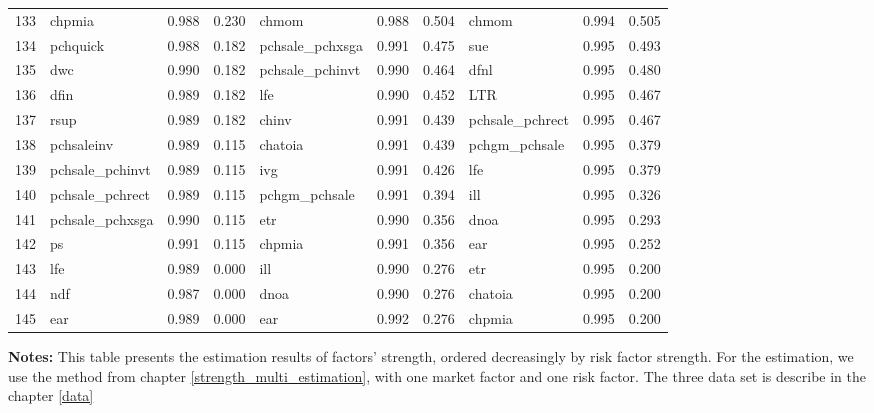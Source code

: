 \begin{landscape}
\begin{footnotesize}
\begin{longtable}{l|lcc|lcc|lcc}
  133 & chpmia & 0.988 & 0.230 & chmom & 0.988 & 0.504 & chmom & 0.994 & 0.505 \\ 
  134 & pchquick & 0.988 & 0.182 & pchsale\_pchxsga & 0.991 & 0.475 & sue & 0.995 & 0.493 \\ 
  135 & dwc & 0.990 & 0.182 & pchsale\_pchinvt & 0.990 & 0.464 & dfnl & 0.995 & 0.480 \\ 
  136 & dfin & 0.989 & 0.182 & lfe & 0.990 & 0.452 & LTR & 0.995 & 0.467 \\ 
  137 & rsup & 0.989 & 0.182 & chinv & 0.991 & 0.439 & pchsale\_pchrect & 0.995 & 0.467 \\ 
  138 & pchsaleinv & 0.989 & 0.115 & chatoia & 0.991 & 0.439 & pchgm\_pchsale & 0.995 & 0.379 \\ 
  139 & pchsale\_pchinvt & 0.989 & 0.115 & ivg & 0.991 & 0.426 & lfe & 0.995 & 0.379 \\ 
  140 & pchsale\_pchrect & 0.989 & 0.115 & pchgm\_pchsale & 0.991 & 0.394 & ill & 0.995 & 0.326 \\ 
  141 & pchsale\_pchxsga & 0.990 & 0.115 & etr & 0.990 & 0.356 & dnoa & 0.995 & 0.293 \\ 
  142 & ps & 0.991 & 0.115 & chpmia & 0.991 & 0.356 & ear & 0.995 & 0.252 \\ 
  143 & lfe & 0.989 & 0.000 & ill & 0.990 & 0.276 & etr & 0.995 & 0.200 \\ 
  144 & ndf & 0.987 & 0.000 & dnoa & 0.990 & 0.276 & chatoia & 0.995 & 0.200 \\ 
  145 & ear & 0.989 & 0.000 & ear & 0.992 & 0.276 & chpmia & 0.995 & 0.200 \\ 
   \hline

\end{longtable}

			\begin{minipage}{1.4\textwidth}
	{\footnotesize {\bf Notes:} 
		This table presents the estimation results of factors' strength, ordered decreasingly by risk factor strength.
For the estimation, we use the method from chapter \ref{strength_multi_estimation},  with one market factor and one risk factor.
The three data set is describe in the chapter \ref{data}}
\end{minipage}
\end{footnotesize}
\end{landscape}

